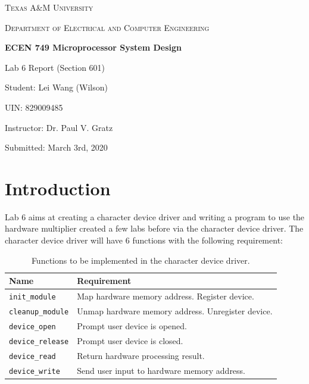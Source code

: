 \documentclass[11pt,letterpaper,titlepage]{article}
\begin{document}
\begin{titlepage}
  \centering
	{\scshape\large Texas A\&M University \par}
	\vspace{1cm}
	{\scshape\Large Department of Electrical and Computer Engineering \par}
	\vspace{4cm}
    \vspace{0.5cm}
	{\huge\bfseries ECEN 749 Microprocessor System Design\par}
	\vspace{4cm}
	{\Large Lab 6 Report (Section 601)\par}
	\vspace{1cm}
	{\Large Student: Lei Wang (Wilson)\par}
	\vspace{1cm}
	{\Large UIN: 829009485\par}
	\vspace{1cm}
	{\Large Instructor: Dr. Paul V. Gratz\par}
	\vspace{4cm}
	\vfill

	{\large Submitted: March 3rd, 2020 \par}

\end{titlepage}

\newpage

\tableofcontents{}

\newpage

\part{Introduction}

Lab 6 aims at creating a character device driver and writing a program to use the hardware multiplier created a few labs before via the character device driver. The character device driver will have 6 functions with the following requirement:

\begin{table}[ht]
\centering
\begin{tabular}{@{}ll@{}}
\toprule
Name            & Requirement                                       \\ \midrule
\texttt{init\_module}    & Map hardware memory address. Register device.     \\ \midrule
\texttt{cleanup\_module} & Unmap hardware memory address. Unregister device. \\ \midrule
\texttt{device\_open}    & Prompt user device is opened.                     \\ \midrule
\texttt{device\_release} & Prompt user device is closed.                     \\ \midrule
\texttt{device\_read}    & Return hardware processing result.                \\ \midrule
\texttt{device\_write}   & Send user input to hardware memory address.       \\ \bottomrule
\end{tabular}
\caption{Functions to be implemented in the character device driver.}
\end{table}
\end{document}
